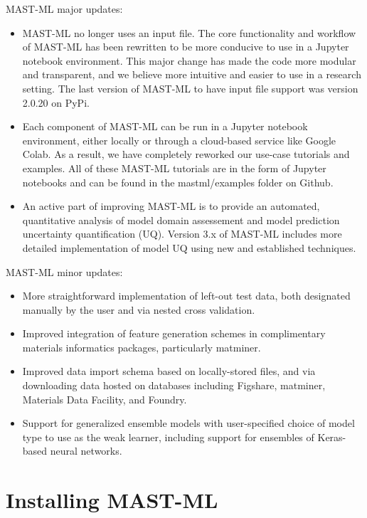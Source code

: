 \documentclass[letterpaper,10pt,english]{sphinxmanual}
\begin{document}
MAST-ML major updates:
\begin{itemize}
\item {} 
MAST-ML no longer uses an input file. The core functionality and workflow of MAST-ML has been rewritten to be more conducive to use in a Jupyter notebook environment. This major change has made the code more modular and transparent, and we believe more intuitive and easier to use in a research setting. The last version of MAST-ML to have input file support was version 2.0.20 on PyPi.

\item {} 
Each component of MAST-ML can be run in a Jupyter notebook environment, either locally or through a cloud-based service like Google Colab. As a result, we have completely reworked our use-case tutorials and examples. All of these MAST-ML tutorials are in the form of Jupyter notebooks and can be found in the mastml/examples folder on Github.

\item {} 
An active part of improving MAST-ML is to provide an automated, quantitative analysis of model domain assessement and model prediction uncertainty quantification (UQ). Version 3.x of MAST-ML includes more detailed implementation of model UQ using new and established techniques.

\end{itemize}

MAST-ML minor updates:
\begin{itemize}
\item {} 
More straightforward implementation of left-out test data, both designated manually by the user and via nested cross validation.

\item {} 
Improved integration of feature generation schemes in complimentary materials informatics packages, particularly matminer.

\item {} 
Improved data import schema based on locally-stored files, and via downloading data hosted on databases including Figshare, matminer, Materials Data Facility, and Foundry.

\item {} 
Support for generalized ensemble models with user-specified choice of model type to use as the weak learner, including support for ensembles of Keras-based neural networks.

\end{itemize}


\chapter{Installing MAST-ML}
\label{\detokenize{0_installation:installing-mast-ml}}\label{\detokenize{0_installation::doc}}
\end{document}
